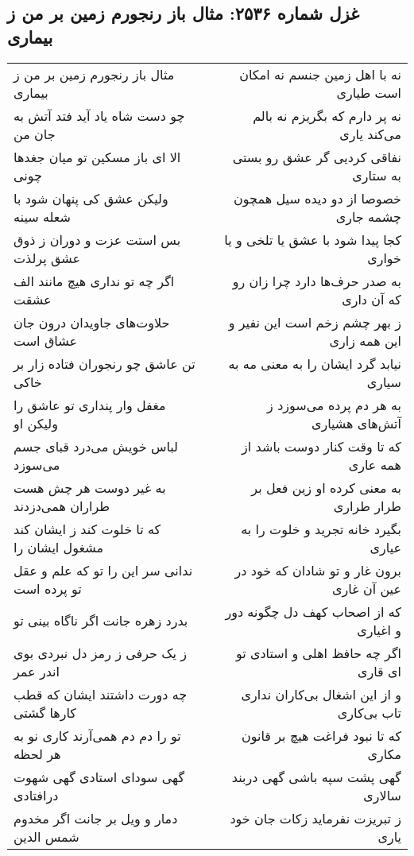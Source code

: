 \begin{center}
\section*{غزل شماره ۲۵۳۶: مثال باز رنجورم زمین بر من ز بیماری}
\label{sec:2536}
\begin{longtable}{l p{0.5cm} r}
مثال باز رنجورم زمین بر من ز بیماری
&&
نه با اهل زمین جنسم نه امکان است طیاری
\\
چو دست شاه یاد آید فتد آتش به جان من
&&
نه پر دارم که بگریزم نه بالم می‌کند یاری
\\
الا ای باز مسکین تو میان جغدها چونی
&&
نفاقی کردیی گر عشق رو بستی به ستاری
\\
ولیکن عشق کی پنهان شود با شعله سینه
&&
خصوصا از دو دیده سیل همچون چشمه جاری
\\
بس استت عزت و دوران ز ذوق عشق پرلذت
&&
کجا پیدا شود با عشق یا تلخی و یا خواری
\\
اگر چه تو نداری هیچ مانند الف عشقت
&&
به صدر حرف‌ها دارد چرا زان رو که آن داری
\\
حلاوت‌های جاویدان درون جان عشاق است
&&
ز بهر چشم زخم است این نفیر و این همه زاری
\\
تن عاشق چو رنجوران فتاده زار بر خاکی
&&
نیابد گرد ایشان را به معنی مه به سیاری
\\
مغفل وار پنداری تو عاشق را ولیکن او
&&
به هر دم پرده می‌سوزد ز آتش‌های هشیاری
\\
لباس خویش می‌درد قبای جسم می‌سوزد
&&
که تا وقت کنار دوست باشد از همه عاری
\\
به غیر دوست هر چش هست طراران همی‌دزدند
&&
به معنی کرده او زین فعل بر طرار طراری
\\
که تا خلوت کند ز ایشان کند مشغول ایشان را
&&
بگیرد خانه تجرید و خلوت را به عیاری
\\
ندانی سر این را تو که علم و عقل تو پرده است
&&
برون غار و تو شادان که خود در عین آن غاری
\\
بدرد زهره جانت اگر ناگاه بینی تو
&&
که از اصحاب کهف دل چگونه دور و اغیاری
\\
ز یک حرفی ز رمز دل نبردی بوی اندر عمر
&&
اگر چه حافظ اهلی و استادی تو ای قاری
\\
چه دورت داشتند ایشان که قطب کارها گشتی
&&
و از این اشغال بی‌کاران نداری تاب بی‌کاری
\\
تو را دم دم همی‌آرند کاری نو به هر لحظه
&&
که تا نبود فراغت هیچ بر قانون مکاری
\\
گهی سودای استادی گهی شهوت درافتادی
&&
گهی پشت سپه باشی گهی دربند سالاری
\\
دمار و ویل بر جانت اگر مخدوم شمس الدین
&&
ز تبریزت نفرماید زکات جان خود یاری
\\
\end{longtable}
\end{center}
